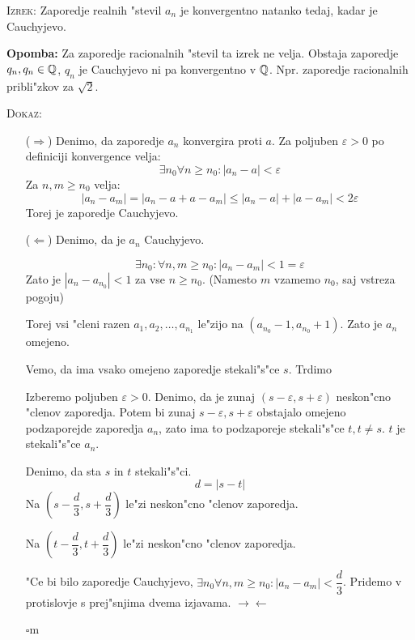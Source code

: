 \textsc{Izrek:} Zaporedje realnih "stevil $a_n$ je konvergentno natanko tedaj, kadar je Cauchyjevo.

\textbf{Opomba:} Za zaporedje racionalnih "stevil ta izrek ne velja. Obstaja zaporedje $q_n, q_n \in \mathbb{Q}$, $q_n$ je Cauchyjevo ni pa konvergentno v $\mathbb{Q}$. Npr. zaporedje racionalnih pribli"zkov za $\sqrt{2}$.

\textsc{Dokaz}:
\begin{itemize}
	\item[($\Rightarrow$)] Denimo, da zaporedje $a_n$ konvergira proti $a$. Za poljuben $\varepsilon > 0$ po definiciji konvergence velja:
	\begin{equation*}
	\exists n_0 \forall n \geq n_0: |a_n - a| < \varepsilon
	\end{equation*}
	Za $n, m \geq n_0$ velja:
	\begin{equation*}
	|a_n - a_m| = |a_n - a + a - a_m| \leq |a_n - a| + |a - a_m| < 2 \varepsilon
	\end{equation*}
	Torej je zaporedje Cauchyjevo.
	
	\item[($\Leftarrow$)] Denimo, da je $a_n$ Cauchyjevo.
	
	\begin{equation*}
	\exists n_0: \forall n, m \geq n_0: |a_n - a_m| < 1 = \varepsilon
	\end{equation*}
	Zato je $|a_n - a_{n_0}| < 1$ za vse $n \geq n_0$. (Namesto $m$ vzamemo $n_0$, saj vstreza pogoju)
	
	Torej vsi "cleni razen $a_1, a_2, \ldots, a_{n_1}$ le"zijo na $(a_{n_0} - 1, a_{n_0} + 1)$. Zato je $a_n$ omejeno.
	
	Vemo, da ima vsako omejeno zaporedje stekali"s"ce $s$. Trdimo 
	
	Izberemo poljuben $\varepsilon > 0$. Denimo, da je zunaj $(s - \varepsilon, s + \varepsilon)$ neskon"cno "clenov zaporedja. Potem bi zunaj $s - \varepsilon, s + \varepsilon$ obstajalo omejeno podzaporejde zaporedja $a_n$, zato ima to podzaporeje stekali"s"ce $t, t \neq s$. $t$ je stekali"s"ce $a_n$.
	
	
	Denimo, da sta $s$ in $t$ stekali"s"ci.
	\begin{equation*}
	d = |s - t|
	\end{equation*}
	Na $(s - \dfrac{d}{3}, s + \dfrac{d}{3})$ le"zi neskon"cno "clenov zaporedja.
	
	Na $(t - \dfrac{d}{3}, t + \dfrac{d}{3})$ le"zi neskon"cno "clenov zaporedja.
	
	"Ce bi bilo zaporedje Cauchyjevo, $\exists n_0 \forall n, m \geq n_0: |a_n - a_m| < \dfrac{d}{3}$. Pridemo v protislovje s prej"snjima dvema izjavama. $\rightarrow \leftarrow$
	
	\hfill $\square$m
\end{itemize}